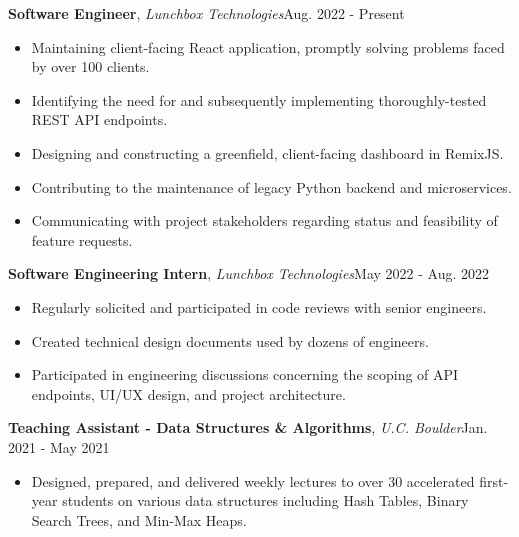 \documentclass[12pt]{article}
\begin{document}
\begin{flushleft}

  \hrulefill {} \quad \hrulefill

  \vspace{2mm}

  {\textbf{Software Engineer}}, \textit{Lunchbox Technologies}\hfill Aug. 2022 - Present
  \vspace{-2mm}
  \begin{itemize} \setlength\itemsep{-0.3em}
      \item Maintaining client-facing React application, promptly solving problems faced by over 100 clients.
      \item Identifying the need for and subsequently implementing thoroughly-tested REST API endpoints.
      \item Designing and constructing a greenfield, client-facing dashboard in RemixJS. 
      \item Contributing to the maintenance of legacy Python backend and microservices.
      \item Communicating with project stakeholders regarding status and feasibility of feature requests.
  \end{itemize}

  {\textbf{Software Engineering Intern}}, \textit{Lunchbox Technologies}\hfill May 2022 - Aug. 2022
  \vspace{-2mm}
  \begin{itemize} \setlength\itemsep{-0.3em}
    \item Regularly solicited and participated in code reviews with senior engineers.
    \item Created technical design documents used by dozens of engineers. %
    \item Participated in engineering discussions concerning the scoping of API endpoints, UI/UX design, and project architecture.
  \end{itemize}


  {\textbf{Teaching Assistant - Data Structures \& Algorithms}}, \textit{U.C. Boulder}\hfill Jan. 2021 - May 2021
  \vspace{-2mm}
  \begin{itemize} \setlength\itemsep{-0.3em}
    \item Designed, prepared, and delivered weekly lectures to over 30 accelerated first-year students on various data structures including Hash Tables, Binary Search Trees, and Min-Max Heaps. %
  \end{itemize}

\end{flushleft}
\end{document}
